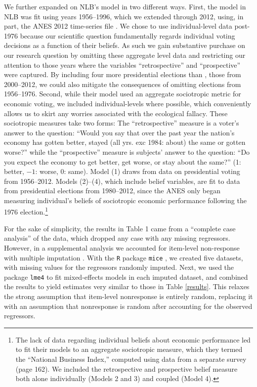 \documentclass[11pt]{article}
\begin{document}
We further expanded on NLB's model in two different ways. First, the model in NLB was fit using years 1956--1996, which we extended through 2012, using, in part, the ANES 2012 time-series file \cite{ANES2012}.
We chose to use individual-level data post-1976 because our scientific question fundamentally regards individual voting decisions as a function of their beliefs. As such we gain substantive purchase on our research question by omitting these aggregate level data and restricting our attention to those years where the variables ``retrospective'' and ``prospective'' were captured. By including four more presidential elections than \citet{Nadeau:2001tw}, those from 2000--2012, we could also mitigate the consequences of omitting elections from 1956--1976.
Second, while their model used an aggregate sociotropic metric for economic voting, we included individual-levels where possible, which conveniently allows us to skirt any worries associated with the ecological fallacy. These sociotropic measures take two forms:
The ``retrospective'' measure is a voter's answer to the question: ``Would you say that over the past year the nation's economy has gotten better, stayed (all yrs. exc 1984: about) the same or gotten worse?'' while
 the ``prospective'' measure is subjects' answer to the question: ``Do you expect the economy to get better, get
worse, or stay about the same?'' (1: better, $-1$: worse, 0: same). Model (1) draws from data on presidential voting from 1956--2012. Models (2)--(4), which include belief variables, are fit to data from presidential elections from 1980--2012, since the ANES only began measuring individual's beliefs of sociotropic economic performance following the 1976 election.\footnote{The lack of data regarding individual beliefs about economic performance led \citet{Nadeau:2001tw} to fit their models to an aggregate sociotropic measure, which they termed the ``National Business Index,'' computed using data from a separate survey (page 162). We included the retrospective and prospective belief measure both alone individually (Models 2 and 3) and coupled (Model 4).}


For the sake of simplicity, the results in Table 1 came from a ``complete case analysis'' of the data, which dropped any case with any missing regressors. However, in a supplemental analysis we accounted for item-level non-response with multiple imputation \citep{rubin2004multiple}.
With the \verb|R| package \verb|mice| \citep{mice}, we created five datasets, with missing values for the regressors randomly imputed.
Next, we used the package \verb|lme4| \citep{lme4} to fit mixed-effects models in each imputed dataset, and combined the results to yield estimates very similar to those in Table \ref{results}.
This relaxes the strong assumption that item-level nonresponse is entirely random, replacing it with an assumption that nonresponse is random after accounting for the observed regressors.
\end{document}
